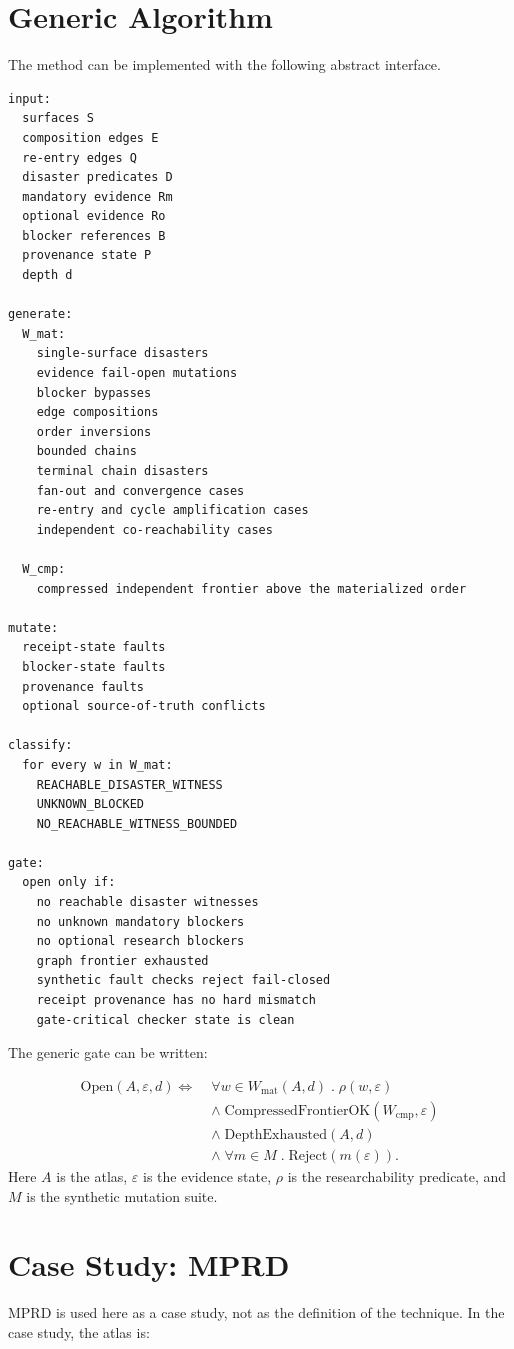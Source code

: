 \documentclass[11pt]{article}
\begin{document}
\section{Generic Algorithm}
The method can be implemented with the following abstract interface.

\begin{verbatim}
input:
  surfaces S
  composition edges E
  re-entry edges Q
  disaster predicates D
  mandatory evidence Rm
  optional evidence Ro
  blocker references B
  provenance state P
  depth d

generate:
  W_mat:
    single-surface disasters
    evidence fail-open mutations
    blocker bypasses
    edge compositions
    order inversions
    bounded chains
    terminal chain disasters
    fan-out and convergence cases
    re-entry and cycle amplification cases
    independent co-reachability cases

  W_cmp:
    compressed independent frontier above the materialized order

mutate:
  receipt-state faults
  blocker-state faults
  provenance faults
  optional source-of-truth conflicts

classify:
  for every w in W_mat:
    REACHABLE_DISASTER_WITNESS
    UNKNOWN_BLOCKED
    NO_REACHABLE_WITNESS_BOUNDED

gate:
  open only if:
    no reachable disaster witnesses
    no unknown mandatory blockers
    no optional research blockers
    graph frontier exhausted
    synthetic fault checks reject fail-closed
    receipt provenance has no hard mismatch
    gate-critical checker state is clean
\end{verbatim}
The generic gate can be written:

\[
\begin{aligned}
\mathrm{Open}(A,\varepsilon,d)\Longleftrightarrow\;&
\forall w\in W_{\mathrm{mat}}(A,d)\;.\;\rho(w,\varepsilon)\\
&\wedge\;\mathrm{CompressedFrontierOK}(W_{\mathrm{cmp}},\varepsilon)\\
&\wedge\;\mathrm{DepthExhausted}(A,d)\\
&\wedge\;\forall m\in M\;.\;\mathrm{Reject}(m(\varepsilon)).
\end{aligned}
\]
Here $A$ is the atlas, $\varepsilon$ is the evidence state, $\rho$ is the researchability predicate, and $M$ is the synthetic mutation suite.

\section{Case Study: MPRD}
MPRD is used here as a case study, not as the definition of the technique. In the case study, the atlas is:
\end{document}
